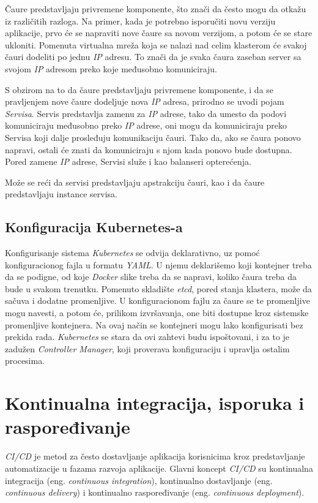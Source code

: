 Čaure predstavljaju privremene komponente, što znači da često mogu da otkažu iz različitih razloga. 
Na primer, kada je potrebno isporučiti novu verziju aplikacije, prvo će se napraviti nove čaure sa 
novom verzijom, a potom će se stare ukloniti. Pomenuta virtualna mreža koja se nalazi nad celim 
klasterom će svakoj čauri dodeliti po jednu \textit{IP} adresu. To znači da je svaka čaura zaseban server sa 
svojom \textit{IP} adresom preko koje međusobno komuniciraju.

S obzirom na to da čaure predstavljaju privremene komponente, i da se pravljenjem nove čaure dodeljuje 
nova \textit{IP} adresa, prirodno se uvodi pojam {\em Servisa}. Servis predstavlja zamenu za \textit{IP} adrese, tako 
da umesto da podovi komuniciraju međusobno preko \textit{IP} adrese, oni mogu da komuniciraju preko Servisa 
koji dalje prosleđuju komunikaciju čauri. Tako da, ako se čaura ponovo napravi, ostali će znati da komuniciraju 
s njom kada ponovo bude dostupna. Pored zamene \textit{IP} adrese, Servisi služe i kao balanseri opterećenja. 

Može se reći da servisi predstavljaju apstrakciju čauri, kao i da čaure predstavljaju instance servisa.

\subsection{Konfiguracija Kubernetes-a}
Konfigurisanje sistema \textit{Kubernetes} se odvija deklarativno, uz pomoć konfiguracionog fajla u formatu \textit{YAML}. U njemu deklarišemo
koji kontejner treba da se podigne, od koje \textit{Docker} slike treba da se napravi, koliko čaura treba 
da bude u svakom trenutku. Pomenuto skladište {\em etcd}, pored stanja klastera, može da sačuva i dodatne promenljive.
U konfiguracionom fajlu za čaure se te promenljive mogu navesti, a potom će, prilikom izvršavanja, one biti 
dostupne kroz sistemske promenljive kontejnera. Na ovaj način se kontejneri mogu lako konfigurisati bez prekida rada. 
\textit{Kubernetes} se stara da ovi zahtevi budu ispoštovani, i za to je zadužen \textit{Controller Manager}, 
koji proverava konfiguraciju i upravlja ostalim procesima. 


\section{Kontinualna integracija, isporuka i raspoređivanje}\label{sec:arhitektura-ci_cd}

\textit{CI/CD} je metod za često dostavljanje aplikacija korisnicima kroz predstavljanje automatizacije u 
fazama razvoja aplikacije. Glavni koncept \textit{CI/CD} su kontinualna integracija (eng. 
\textit{continuous integration}), kontinualno dostavljanje (eng. \textit{continuous delivery}) i 
kontinualno raspoređivanje (eng. \textit{continuous deployment}).

